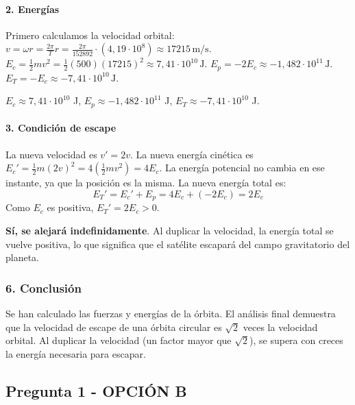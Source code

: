 \paragraph*{2. Energías}
Primero calculamos la velocidad orbital: $v = \omega r = \frac{2\pi}{T}r = \frac{2\pi}{152892} \cdot (4,19 \cdot 10^8) \approx 17215 \, \text{m/s}$.
$E_c = \frac{1}{2}mv^2 = \frac{1}{2}(500)(17215)^2 \approx 7,41 \cdot 10^{10} \, \text{J}$.
$E_p = -2E_c \approx -1,482 \cdot 10^{11} \, \text{J}$.
$E_T = -E_c \approx -7,41 \cdot 10^{10} \, \text{J}$.
\begin{cajaresultado}
    $E_c \approx 7,41 \cdot 10^{10}$ J, $E_p \approx -1,482 \cdot 10^{11}$ J, $E_T \approx -7,41 \cdot 10^{10}$ J.
\end{cajaresultado}

\paragraph*{3. Condición de escape}
La nueva velocidad es $v' = 2v$. La nueva energía cinética es $E_c' = \frac{1}{2}m(2v)^2 = 4(\frac{1}{2}mv^2) = 4E_c$.
La energía potencial no cambia en ese instante, ya que la posición es la misma. La nueva energía total es:
$$E_T' = E_c' + E_p = 4E_c + (-2E_c) = 2E_c$$
Como $E_c$ es positiva, $E_T' = 2E_c > 0$.
\begin{cajaresultado}
    \textbf{Sí, se alejará indefinidamente}. Al duplicar la velocidad, la energía total se vuelve positiva, lo que significa que el satélite escapará del campo gravitatorio del planeta.
\end{cajaresultado}

\subsubsection*{6. Conclusión}
\begin{cajaconclusion}
Se han calculado las fuerzas y energías de la órbita. El análisis final demuestra que la velocidad de escape de una órbita circular es $\sqrt{2}$ veces la velocidad orbital. Al duplicar la velocidad (un factor mayor que $\sqrt{2}$), se supera con creces la energía necesaria para escapar.
\end{cajaconclusion}

\newpage

\subsection{Pregunta 1 - OPCIÓN B}
\label{subsec:1B_2004_jun_ord}

